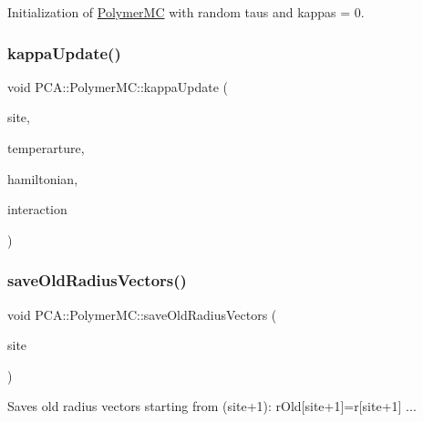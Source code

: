 Initialization of \hyperlink{class_p_c_a_1_1_polymer_m_c}{Polymer\+MC} with random taus and kappas = 0. 

\hypertarget{class_p_c_a_1_1_polymer_m_c_a8d70317037e998d3a27618a9ecb60fd8}{}\label{class_p_c_a_1_1_polymer_m_c_a8d70317037e998d3a27618a9ecb60fd8} 
\subsubsection{\texorpdfstring{kappa\+Update()}{kappaUpdate()}}
{\footnotesize\ttfamily void P\+C\+A\+::\+Polymer\+M\+C\+::kappa\+Update (\begin{DoxyParamCaption}\item[{int}]{site,  }\item[{double}]{temperarture,  }\item[{const \hyperlink{class_p_c_a_1_1_hamiltonian}{Hamiltonian} \&}]{hamiltonian,  }\item[{const \hyperlink{class_p_c_a_1_1_lennard_jones}{Lennard\+Jones} \&}]{interaction }\end{DoxyParamCaption})}

\hypertarget{class_p_c_a_1_1_polymer_m_c_a6e0c4626aff4270d9a1ece7fc51f3c0f}{}\label{class_p_c_a_1_1_polymer_m_c_a6e0c4626aff4270d9a1ece7fc51f3c0f} 
\subsubsection{\texorpdfstring{save\+Old\+Radius\+Vectors()}{saveOldRadiusVectors()}}
{\footnotesize\ttfamily void P\+C\+A\+::\+Polymer\+M\+C\+::save\+Old\+Radius\+Vectors (\begin{DoxyParamCaption}\item[{int}]{site }\end{DoxyParamCaption})}



Saves old radius vectors starting from (site+1)\+: r\+Old\mbox{[}site+1\mbox{]}=r\mbox{[}site+1\mbox{]} ... 

\hypertarget{class_p_c_a_1_1_polymer_m_c_a6f7e8a68070a688e1d6b0dc00a13b27c}{}\label{class_p_c_a_1_1_polymer_m_c_a6f7e8a68070a688e1d6b0dc00a13b27c} 
